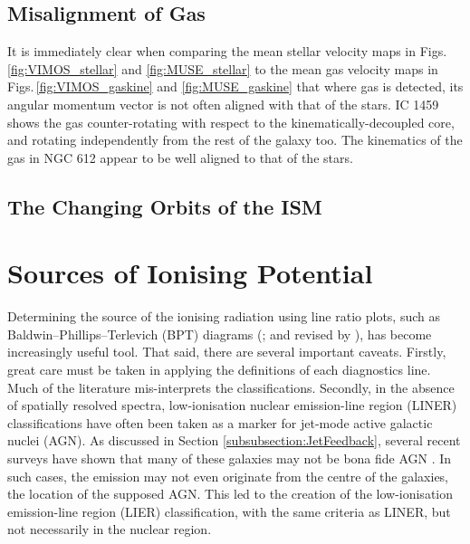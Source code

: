 	\subsection{Misalignment of Gas}
		\label{subsec:Gasmisaligment}
		It is immediately clear when comparing the mean stellar velocity maps in Figs.\,\ref{fig:VIMOS_stellar} and \ref{fig:MUSE_stellar} to the mean gas velocity maps in Figs.\,\ref{fig:VIMOS_gaskine} and \ref{fig:MUSE_gaskine} that where gas is detected, its angular momentum vector is not often aligned with that of the stars. IC 1459 shows the gas counter-rotating with respect to the kinematically-decoupled core, and rotating independently from the rest of the galaxy too. The kinematics of the gas in NGC 612 appear to be well aligned to that of the stars. 




	\subsection{The Changing Orbits of the ISM}
		\label{subsec:outflows}

































\section{Sources of Ionising Potential}
	\label{sec:Diagnostics}
	Determining the source of the ionising radiation using line ratio plots, such as Baldwin--Phillips--Terlevich (BPT) diagrams (\citealt{Baldwin1981}; and revised by \citealt{Kewley2001, Kauffmann2003a}), has become increasingly useful tool. That said, there are several important caveats. Firstly, great care must be taken in applying the definitions of each diagnostics line. Much of the literature mis-interprets the classifications. Secondly, in the absence of spatially resolved spectra, low-ionisation nuclear emission-line region (LINER) classifications have often been taken as a marker for jet-mode active galactic nuclei (AGN). As discussed in Section \ref{subsubsection:JetFeedback}, several recent surveys have shown that many of these galaxies may not be bona fide AGN \citep[e.g.][]{Sarzi2005, Sarzi2010, Singh2013, Belfiore2016a}. In such cases, the emission may not even originate from the centre of the galaxies, the location of the supposed AGN. This led to the creation of the low-ionisation emission-line region (LIER) classification, with the same criteria as LINER, but not necessarily in the nuclear region.


